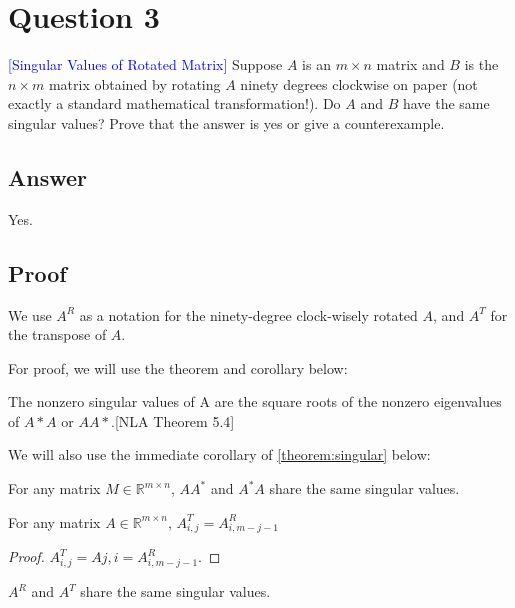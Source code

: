 \section*{Question 3}
\textcolor{blue}{[Singular Values of Rotated Matrix]} Suppose $A$ is an $m \times n$ matrix and $B$ is the $n \times m$ matrix obtained by
rotating $A$ ninety degrees clockwise on paper (not exactly a standard mathematical transformation!). 
Do $A$ and $B$ have the same singular values? 
Prove that the answer is yes or give a counterexample.

\subsection*{Answer}
Yes. 

\subsection*{Proof}
\begin{notation}
We use $A^{R}$ as a  notation for the  ninety-degree clock-wisely rotated $A$,
and $A^T$ for the transpose of $A$.
\end{notation}

For proof, we will use the theorem and corollary below:
\begin{theorem}
\label{theorem:singular}
The nonzero singular values of A are the square roots of the nonzero eigenvalues of $A*A$ or $AA*$.[NLA Theorem 5.4]
\end{theorem}

We will also use the immediate corollary of \ref{theorem:singular} below:
\begin{corollary}
\label{corollary:singular}
For any matrix  $M \in \mathbb{R}^{m \times n}$,
$AA^*$ and $A^*A$ share the same singular values.
\end{corollary}

\begin{lemma}
\label{lem:lem1}
For any matrix $A \in \mathbb{R}^{m \times n}$,
$A^T_{i,j}=A^R_{i,m-j-1}$ 
\end{lemma}

\begin{proof}
$A^T_{i,j} = A{j,i} = A^R_{i,m-j-1}$.
\end{proof}

\begin{lemma}
\label{lem:lem2}
$A^{R}$ and $A^T$ share the same singular values.
\end{lemma}

